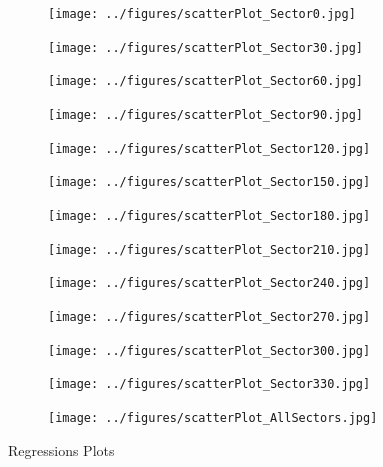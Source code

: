 \documentclass[10pt]{article}
\begin{document}
\begin{figure}[H]
\begin{subfigure}{0.33\textwidth}
  \centering
  \texttt{[image: ../figures/scatterPlot\_Sector0.jpg]}
\end{subfigure}
\begin{subfigure}{0.33\textwidth}
  \centering
  \texttt{[image: ../figures/scatterPlot\_Sector30.jpg]}
\end{subfigure}
\begin{subfigure}{0.33\textwidth}
  \centering
  \texttt{[image: ../figures/scatterPlot\_Sector60.jpg]}
\end{subfigure}
\begin{subfigure}{0.3\textwidth}
  \centering
  \texttt{[image: ../figures/scatterPlot\_Sector90.jpg]}
\end{subfigure}
\begin{subfigure}{0.3\textwidth}
  \centering
  \texttt{[image: ../figures/scatterPlot\_Sector120.jpg]}
\end{subfigure}
\begin{subfigure}{0.3\textwidth}
  \centering
  \texttt{[image: ../figures/scatterPlot\_Sector150.jpg]}
\end{subfigure}
\begin{subfigure}{0.3\textwidth}
  \centering
  \texttt{[image: ../figures/scatterPlot\_Sector180.jpg]}
\end{subfigure}
\begin{subfigure}{0.3\textwidth}
  \centering
  \texttt{[image: ../figures/scatterPlot\_Sector210.jpg]}
\end{subfigure}
\begin{subfigure}{0.3\textwidth}
  \centering
  \texttt{[image: ../figures/scatterPlot\_Sector240.jpg]}
\end{subfigure}
\begin{subfigure}{0.3\textwidth}
  \centering
  \texttt{[image: ../figures/scatterPlot\_Sector270.jpg]}
\end{subfigure}
\begin{subfigure}{0.3\textwidth}
  \centering
  \texttt{[image: ../figures/scatterPlot\_Sector300.jpg]}
\end{subfigure}
\begin{subfigure}{0.3\textwidth}
  \centering
  \texttt{[image: ../figures/scatterPlot\_Sector330.jpg]}
\end{subfigure}
\begin{subfigure}{0.3\textwidth}
  \centering
  \texttt{[image: ../figures/scatterPlot\_AllSectors.jpg]}
\end{subfigure}
  \caption{Regressions Plots}
\label{fig:Regression}
\end{figure}
\end{document}
